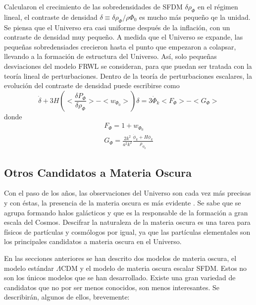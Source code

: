 \documentclass[a4paper,openright,12pt]{book}
\begin{document}
Calcularon el crecimiento de las sobredensidades de SFDM $\delta\rho_{\Phi}$ en el régimen lineal, el contraste de densidad $\delta \equiv \delta\rho_{\Phi}/\rho\Phi_{0}$ es mucho más pequeño qe la unidad. Se piensa que el Universo era casi uniforme después de la inflación, con un contraste de densidad muy pequeño. A medida que el Universo se expande, las pequeñas sobredensiades crecieron hasta el punto que empezaron a colapsar, llevando a la formación de estructura del Universo. Así, solo pequeñas desviaciones del modelo FRWL se consideran, para que puedan ser tratada con la teoría lineal de perturbaciones. Dentro de la teoría de perturbaciones escalares, la evolución del contraste de densidad puede escribirse como 
\begin{equation}
\dot{\delta} + 3H\left(<\frac{\delta P_{\Phi}}{\delta \rho_{\Phi}}> 
- <w_{\Phi_{0}}>\right)\delta
=
3\dot{\Phi}_{k}<F_{\Phi}> - <G_{\Phi}>\label{eqn 1.49}
\end{equation}
donde
\begin{equation}
  \begin{array}{ll}
    F_{\Phi} = 1 + w_{\Phi_{0}} \\
    G_{\Phi} = \frac{2 k^{2}}{a^{2}k^{2}}\frac{\dot{\phi}_{k}+ H\phi_{k}}{\rho_{\phi_{0}}}\label{eqn 1.50}
  \end{array}
\end{equation}

\subsection{Otros Candidatos a Materia Oscura}
Con el paso de los años, las observaciones del Universo son cada vez más precisas y con éstas, la presencia de la materia oscura es más evidente \cite{1.3.2.1}. Se sabe que se agrupa formando halos galácticos y que es la responsable de la formación a gran escala del Cosmos. Descifrar la naturaleza de la materia oscura es una tarea para físicos de partículas y cosmólogos por igual, ya que las partículas elementales son los principales candidatos a materia oscura en el Universo. 

En las secciones anteriores se han descrito dos modelos de materia oscura, el modelo estándar $\Lambda$CDM y el modelo de materia oscura escalar SFDM. Estos no son los únicos modelos que se han desarrollado. Existe una gran variedad de candidatos que no por ser menos conocidos, son menos interesantes. Se describirán, algunos de ellos, brevemente:
\end{document}
